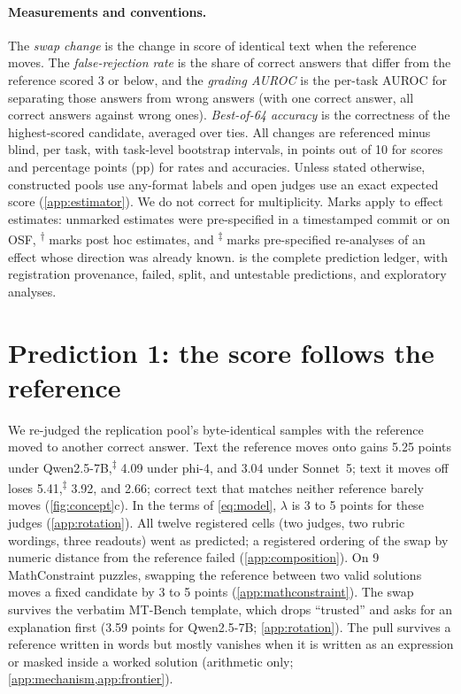 \documentclass{article}
\newcommand{\reana}{\textsuperscript{$\ddagger$}}
\newcommand{\ph}{\textsuperscript{$\dagger$}}
\begin{document}
\paragraph{Measurements and conventions.}
The \emph{swap change} is the change in score of identical text when the reference moves. The \emph{false-rejection rate} is the share of correct answers that differ from the reference scored 3 or below, and the \emph{grading AUROC} is the per-task AUROC for separating those answers from wrong answers (with one correct answer, all correct answers against wrong ones). \emph{Best-of-64 accuracy} is the correctness of the highest-scored candidate, averaged over ties. All changes are referenced minus blind, per task, with task-level bootstrap intervals, in points out of 10 for scores and percentage points (pp) for rates and accuracies. Unless stated otherwise, constructed pools use any-format labels and open judges use an exact expected score (\cref{app:estimator}). We do not correct for multiplicity.
Marks apply to effect estimates: unmarked estimates were pre-specified in a timestamped commit or on OSF, \ph{} marks post hoc estimates, and \reana{} marks pre-specified re-analyses of an effect whose direction was already known.  is the complete prediction ledger, with registration provenance, failed, split, and untestable predictions, and exploratory analyses.

\section{Prediction 1: the score follows the reference}
\label{sec:p1}

We re-judged the replication pool's byte-identical samples with the reference moved to another correct answer.
Text the reference moves onto gains 5.25 points under Qwen2.5-7B,\reana{} 4.09 under phi-4, and 3.04 under Sonnet~5; text it moves off loses 5.41,\reana{} 3.92, and 2.66; correct text that matches neither reference barely moves (\cref{fig:concept}c). In the terms of \cref{eq:model}, $\lambda$ is 3 to 5 points for these judges (\cref{app:rotation}).
All twelve registered cells (two judges, two rubric wordings, three readouts) went as predicted; a registered ordering of the swap by numeric distance from the reference failed (\cref{app:composition}). On 9 MathConstraint puzzles, swapping the reference between two valid solutions moves a fixed candidate by 3 to 5 points (\cref{app:mathconstraint}).
The swap survives the verbatim MT-Bench template, which drops ``trusted'' and asks for an explanation first (3.59 points for Qwen2.5-7B; \cref{app:rotation}). The pull survives a reference written in words but mostly vanishes when it is written as an expression or masked inside a worked solution (arithmetic only; \cref{app:mechanism,app:frontier}).
\end{document}
